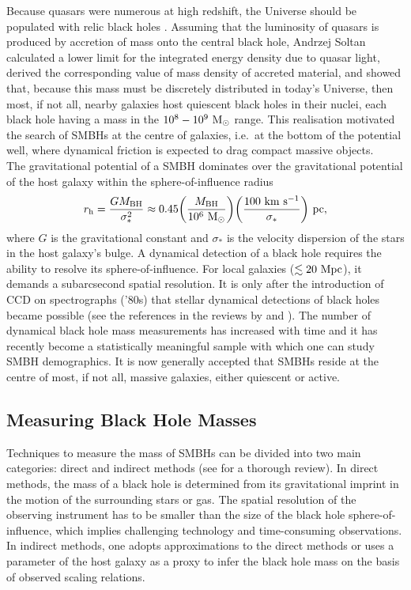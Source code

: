 Because quasars were numerous at high redshift, the Universe should be populated with relic black holes \citep{soltan1982}. 
Assuming that the luminosity of quasars is produced by accretion of mass onto the central black hole, 
Andrzej Soltan calculated a lower limit for the integrated energy density due to quasar light, 
derived the corresponding value of mass density of accreted material, 
and showed that, because this mass must be discretely distributed in today's Universe, 
then most, if not all, nearby galaxies host quiescent black holes in their nuclei, 
each black hole having a mass in the $10^8 - 10^9~\rm M_{\odot}$ range. 
This realisation motivated the search of SMBHs at the centre of galaxies, 
i.e.~at the bottom of the potential well, 
where dynamical friction is expected to drag compact massive objects. \\

The gravitational potential of a SMBH dominates over the gravitational potential of the host galaxy within the 
sphere-of-influence radius 
\begin{equation}
r_{\rm h} = \frac{G M_{\rm BH}}{\sigma_*^2} \approx 0.45 \biggl ( \frac{M_{\rm BH}}{10^6 \rm~M_{\odot}} \biggr ) 
\biggl ( \frac{100 \rm~km~s^{-1}}{\sigma_*} \biggr ) \rm~pc ,
\end{equation}
where $G$ is the gravitational constant and $\sigma_*$ is the velocity dispersion of the stars in the 
host galaxy's bulge.
A dynamical detection of a black hole requires the ability to resolve its sphere-of-influence.
For local galaxies ($\lesssim 20~\rm Mpc$), it demands a subarcsecond spatial resolution.
It is only after the introduction of CCD on spectrographs ('80s) that stellar dynamical 
detections of black holes became possible (see the references in the reviews by 
\citealt{kormendyrichstone1995} and \citealt{richstone1998}).
The number of dynamical black hole mass measurements has increased with time and it has recently become a 
statistically meaningful sample with which one can study SMBH demographics. 
It is now generally accepted that SMBHs reside at the centre of most, if not all, 
massive galaxies, either quiescent or active. 


\subsection{Measuring Black Hole Masses}
Techniques to measure the mass of SMBHs can be divided into two main categories: direct and indirect methods 
(see \citealt{ferrareseford2005} for a thorough review). 
In direct methods, the mass of a black hole is determined from its gravitational imprint 
in the motion of the surrounding stars or gas. 
The spatial resolution of the observing instrument has to be smaller than the size of the black hole sphere-of-influence, 
which implies challenging technology and time-consuming observations. 
In indirect methods, one adopts approximations to the direct methods 
or uses a parameter of the host galaxy as a proxy to infer the black hole mass 
on the basis of observed scaling relations. \\

